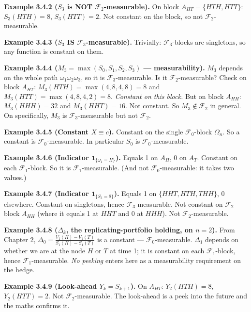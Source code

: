 \documentclass[
  10pt,
  twoside]{book}
\begin{document}
\textbf{Example 3.4.2 (\(S_3\) is NOT \(\mathcal F_2\)-measurable).} On
block \(A_{HT} = \{HTH, HTT\}\): \(S_3(HTH) = 8\), \(S_3(HTT) = 2\). Not
constant on the block, so not \(\mathcal F_2\)-measurable.

\textbf{Example 3.4.3 (\(S_3\) IS \(\mathcal F_3\)-measurable).}
Trivially: \(\mathcal F_3\)-blocks are singletons, so any function is
constant on them.

\textbf{Example 3.4.4 (\(M_3 = \max(S_0, S_1, S_2, S_3)\) ---
measurability).} \(M_3\) depends on the whole path
\(\omega_1\omega_2\omega_3\), so it is \(\mathcal F_3\)-measurable. Is
it \(\mathcal F_2\)-measurable? Check on block \(A_{HT}\):
\(M_3(HTH) = \max(4, 8, 4, 8) = 8\) and
\(M_3(HTT) = \max(4, 8, 4, 2) = 8\). \emph{Constant on this block.} But
on block \(A_{HH}\): \(M_3(HHH) = 32\) and \(M_3(HHT) = 16\). Not
constant. So \(M_3 \notin \mathcal F_2\) in general. On specifically,
\(M_3\) is \(\mathcal F_3\)-measurable but not \(\mathcal F_2\).

\textbf{Example 3.4.5 (Constant \(X \equiv c\)).} Constant on the single
\(\mathcal F_0\)-block \(\Omega_n\). So a constant is
\(\mathcal F_0\)-measurable. In particular \(S_0\) is
\(\mathcal F_0\)-measurable.

\textbf{Example 3.4.6 (Indicator \(\mathbf 1_{\{\omega_1 = H\}}\)).}
Equals 1 on \(A_H\), 0 on \(A_T\). Constant on each
\(\mathcal F_1\)-block. So it is \(\mathcal F_1\)-measurable. (And not
\(\mathcal F_0\)-measurable: it takes two values.)

\textbf{Example 3.4.7 (Indicator \(\mathbf 1_{\{S_3 = 8\}}\)).} Equals 1
on \(\{HHT, HTH, THH\}\), 0 elsewhere. Constant on singletons, hence
\(\mathcal F_3\)-measurable. Not constant on \(\mathcal F_2\)-block
\(A_{HH}\) (where it equals 1 at \(HHT\) and 0 at \(HHH\)). Not
\(\mathcal F_2\)-measurable.

\textbf{Example 3.4.8 (\(\Delta_k\), the replicating-portfolio holding,
on \(n=2\)).} From Chapter 2,
\(\Delta_0 = \frac{V_1(H) - V_1(T)}{S_1(H) - S_1(T)}\) is a constant ---
\(\mathcal F_0\)-measurable. \(\Delta_1\) depends on whether we are at
the node \(H\) or \(T\) at time 1; it is constant on each
\(\mathcal F_1\)-block, hence \(\mathcal F_1\)-measurable. \emph{No
peeking} enters here as a measurability requirement on the hedge.

\textbf{Example 3.4.9 (Look-ahead \(Y_k = S_{k+1}\)).} On \(A_{HT}\):
\(Y_2(HTH) = 8\), \(Y_2(HTT) = 2\). Not \(\mathcal F_2\)-measurable. The
look-ahead is a peek into the future and the maths confirms it.
\end{document}
